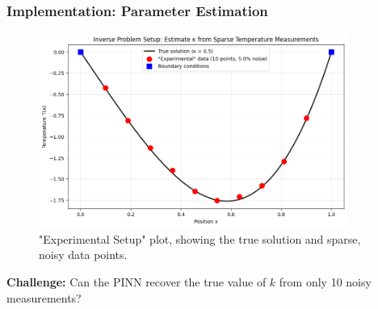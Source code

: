 \documentclass[notes]{beamer}
\begin{document}
\begin{frame}
\frametitle{Implementation: Parameter Estimation}

\begin{figure}[ht]
	\centering
	\includegraphics[width=0.9\textwidth]{figs/inverse-problem-setup.png}
	\caption*{"Experimental Setup" plot, showing the true solution and sparse, noisy data points.}
\end{figure}

\textbf{Challenge:} Can the PINN recover the true value of $k$ from only 10 noisy measurements?

\end{frame}
\end{document}
